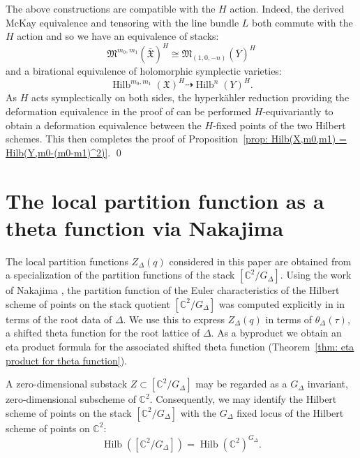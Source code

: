 \documentclass{amsart}
\theoremstyle{definition}
\newcommand{\CC} {{\mathbb C}}          %
\newcommand{\X}{\mathfrak{X}}
\newcommand{\Xbar}{\overline{\mathfrak{X}}}
\newcommand{\Ybar}{\overline{Y}}
\newcommand{\M}{\mathfrak{M}}
\newcommand{\Hilb}{\operatorname{Hilb}}
\newcommand{\adam}{\color{blue}}
\begin{document}
The above constructions are compatible with the $H$ action. Indeed,
the derived McKay equivalence and tensoring with the line bundle $L$
both commute with the $H$ action and so we have an equivalence of
stacks: 
\[
\M^{m_{0},m_{1}}(\Xbar )^{H} \cong \M_{(1,0,-n)}(\Ybar )^{H}
\]
and a birational equivalence of holomorphic symplectic varieties:
\[
\Hilb^{m_{0},m_{1}}(\X )^{H} \dashrightarrow \Hilb^{n}(Y)^{H}.
\]
{\adam As $H$ acts symplectically on both sides, the hyperkähler reduction providing the deformation equivalence in the proof of
\cite[Cor~4.2]{Nakajima1994Duke} can be performed $H$-equivariantly to obtain a deformation equivalence between the $H$-fixed points of the two Hilbert schemes.
}
This
then completes the proof of Proposition~\ref{prop: Hilb(X,m0,m1) =
Hilb(Y,m0-(m0-m1)^2)}. \qed


\section{The local partition function as a theta function via Nakajima}\label{sec: local partition functions}


The local partition functions $Z_{\Delta}(q)$ considered in this paper
are obtained from a specialization of the partition functions of the
stack $[\CC^{2} /G_{\Delta}]$.  Using the work of Nakajima
\cite{nakajima2002geometric}, the partition function of the Euler
characteristics of the Hilbert scheme of points on the stack quotient
$[\CC^{2}/G_{\Delta}]$ was computed explicitly in
\cite{gyenge2015euler} in terms of the root data of $\Delta$.  We use
this to express $Z_{\Delta}(q)$ in terms of $\theta_{\Delta}(\tau )$,
a shifted theta function for the root lattice of $\Delta$. As a
byproduct we obtain an eta product formula for the associated shifted
theta function (Theorem~\ref{thm: eta product for theta function}).



A zero-dimensional substack $Z\subset [\CC^{2}/G_{\Delta}]$ may be
regarded as a $G_{\Delta}$ invariant, zero-dimensional subscheme of
$\CC^{2}$. Consequently, we may identify the Hilbert scheme of points
on the stack $[\CC^{2}/G_{\Delta}]$ with the $G_{\Delta}$ fixed locus
of the Hilbert scheme of points on $\CC^{2}$: 
\[
\Hilb \left([\CC^{2}/G_{\Delta}] \right) = \Hilb
(\CC^{2})^{G_{\Delta}} .
\]
\end{document}
